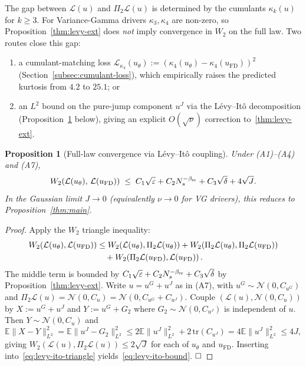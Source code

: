 \documentclass[review,12pt]{elsarticle}
\newtheorem{proposition}{Proposition}
\begin{document}
The gap between \(\mathcal L(u)\) and \(\Pi_2\mathcal L(u)\) is
determined by the cumulants \(\kappa_k(u)\) for \(k \ge 3\). For
Variance-Gamma drivers \(\kappa_3, \kappa_4\) are non-zero, so
Proposition~\ref{thm:levy-ext} does \emph{not} imply convergence in
\(W_2\) on the full law. Two routes close this gap:
\begin{enumerate}
\item a cumulant-matching loss
$\mathcal{L}_{\kappa_4}(u_\theta):=(\kappa_4(u_\theta)-\kappa_4(u_{\mathrm{FD}}))^2$
(Section~\ref{subsec:cumulant-loss}), which empirically raises the
predicted kurtosis from $4.2$ to $25.1$; or
\item an $L^2$ bound on the pure-jump component $u^J$ via the
L\'evy--It\^o decomposition (Proposition~\ref{prop:levy-ito} below),
giving an explicit $O(\sqrt\nu)$ correction to~\eqref{thm:levy-ext}.
\end{enumerate}

\begin{proposition}[Full-law convergence via L\'evy--It\^o coupling]
\label{prop:levy-ito}
Under (A1)--(A4) and (A7),
\begin{equation}
\label{eq:levy-ito-bound}
W_2\!\left(\mathcal{L}(u_\theta),\,\mathcal{L}(u_{\mathrm{FD}})\right)
\;\le\;C_1\sqrt{\varepsilon}+C_2 N_s^{-\beta_{\rm sr}}+C_3\sqrt{\delta}
+4\sqrt{J}.
\end{equation}
In the Gaussian limit $J\to 0$ (equivalently $\nu\to 0$ for VG
drivers), this reduces to Proposition~\ref{thm:main}.
\end{proposition}

\begin{proof}
Apply the $W_2$ triangle inequality:
\begin{align}
\label{eq:levy-ito-triangle}
W_2(\mathcal{L}(u_\theta),\mathcal{L}(u_{\mathrm{FD}}))
&\le
W_2\!\left(\mathcal{L}(u_\theta),\Pi_2\mathcal{L}(u_\theta)\right)
+W_2\!\left(\Pi_2\mathcal{L}(u_\theta),\Pi_2\mathcal{L}(u_{\mathrm{FD}})\right) \notag\\
&\quad+W_2\!\left(\Pi_2\mathcal{L}(u_{\mathrm{FD}}),\mathcal{L}(u_{\mathrm{FD}})\right).
\end{align}
The middle term is bounded by
$C_1\sqrt\varepsilon+C_2 N_s^{-\beta_{\rm sr}}+C_3\sqrt\delta$
by Proposition~\ref{thm:levy-ext}.
Write $u=u^G+u^J$ as in (A7), with
$u^G\sim\mathcal{N}(0,C_{u^G})$ and
$\Pi_2\mathcal{L}(u)=\mathcal{N}(0,C_u)=\mathcal{N}(0,C_{u^G}+C_{u^J})$.
Couple $(\mathcal{L}(u),\mathcal{N}(0,C_u))$ by
$X:=u^G+u^J$ and $Y:=u^G+G_2$
where $G_2\sim\mathcal{N}(0,C_{u^J})$ is independent of $u$.
Then $Y\sim\mathcal{N}(0,C_u)$ and
\[
\mathbb{E}\|X-Y\|^2_{L^2}
=\mathbb{E}\|u^J-G_2\|^2_{L^2}
\le 2\mathbb{E}\|u^J\|^2_{L^2}+2\,\mathrm{tr}(C_{u^J})
= 4\mathbb{E}\|u^J\|^2_{L^2}\le 4J,
\]
giving $W_2(\mathcal{L}(u),\Pi_2\mathcal{L}(u))\le 2\sqrt{J}$ for
each of $u_\theta$ and $u_{\mathrm{FD}}$.
Inserting into~\eqref{eq:levy-ito-triangle} yields~\eqref{eq:levy-ito-bound}.
$\hfill\square$
\end{proof}
\end{document}
